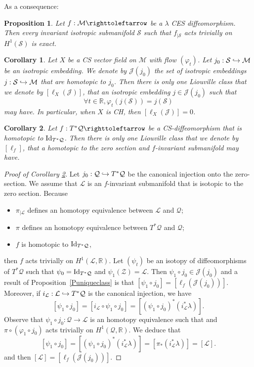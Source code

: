 \documentclass[10pt]{amsart}
\def\hto{\mathrel{\lhook\joinrel\to}}
\newtheorem{corollary}{Corollary}
\newtheorem{proposition}{Proposition}
\theoremstyle{definition}
\def\R{\mathbb{R}}
\def\cL{{\mathcal L}}
\def\cJ{{\mathcal J}}
\def\cM{{\mathcal M}}
\def\cQ{{\mathcal Q}}
\def\cS{{\mathcal S}}
\def\cZ{{\mathcal Z}}
\begin{document}
As a consequence:

\begin{proposition} \label{Pinvalagrexact}
Let $f:\cM \righttoleftarrow$ be a $\lambda$ CES diffeomorphism. Then every invariant isotropic submanifold { $\cS$ such that $f_{|\cS}$ acts trivially on $H^1(\cS)$} is exact.
\end{proposition}

\begin{corollary}\label{Cuniqueclassflow}
Let $X$ be a CS vector field on $\cM$ with flow $(\varphi_t)$. Let $ j_0:\cS\hto\cM$ be an isotropic embedding. We denote by $\cJ(j_0)$ the set of isotropic embeddings $ j:\cS\hto\cM$ that are homotopic to $j_0$. Then there is only one Liouville class that we denote by $[\ell_X(\cJ)]$, that an isotropic embedding $j\in\cJ(j_0)$ such that
\[
\forall t\in\R, \varphi_t(j(\cS))=j(\cS)
\]
may have.
In particular, when $X$ is CH, then $[\ell_X(\cJ)]=0$.
\end{corollary}

\begin{corollary}\label{Cuniqueclasscotangent}
Let $f: T^*\cQ \righttoleftarrow$ be a CS-diffeomorphism that is homotopic to ${\rm Id}_{T^*\cQ}$. Then there is only one Liouville class that we denote by $[\ell_f]$, that a homotopic to the zero section and $f$-invariant submanifold may have.
\end{corollary}

\begin{proof}[Proof of Corollary \ref{Cuniqueclasscotangent}] Let $j_0: \cQ{}\hto T^*\cQ$ be the canonical injection onto the zero-section.
We assume that $\cL$ is an $f$-invariant submanifold that is isotopic to the zero section.
Because
\begin{itemize}
\item
$\pi_{|\cL}$ defines an homotopy equivalence between $\cL$ and $\cQ$;
\item
$\pi$ defines an homotopy equivalence between $T^*\cQ$ and $\cQ$;
\item
$f$ is homotopic to ${\rm Id}_{T^*\cQ}$,
\end{itemize}
then $f$ acts trivially on $H^1(\cL,\R)$.
Let $(\psi_t)$ be an isotopy of diffeomorphisms of $T^*\cQ$ such that $\psi_0={\rm Id}_{T^*\cQ}$ and $\psi_1(\cZ)=\cL$. Then $\psi_1\circ j_0\in \cJ(j_0)$ and
a result of Proposition~\ref{Puniqueclass} is that $[\psi_1\circ j_0]=[\ell_f(\cJ(j_0))]$.
Moreover, if $i_\cL:\cL\hto T^*\cQ$ is the canonical injection, we have
\[
[\psi_1\circ j_0]=[i_\cL\circ\psi_1\circ j_0]=[(\psi_1\circ j_0)^*(i_\cL^*\lambda)].
\]
Observe that $\psi_1\circ j_0:\cQ\to \cL$ is an homotopy equivalence such that and $\pi\circ (\varphi_1\circ j_0)$ acts trivially on $H^1(\cQ, \R)$. We deduce that
\[
[\psi_1\circ j_0]=[(\psi_1\circ j_0)^*(i_\cL^*\lambda)]=[\pi_*(i_\cL^*\lambda)]=[\cL].
\]
and then $[\cL]=[\ell_f(\cJ(j_0))]$.
\end{proof}
\end{document}
